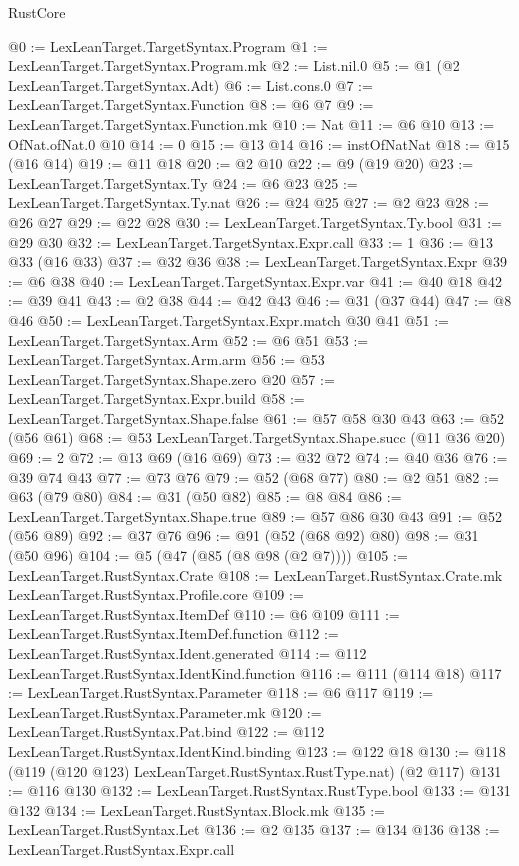 \begin{lexlean}{RustCore}
\begin{coremodule}
@0 := LexLeanTarget.TargetSyntax.Program
@1 := LexLeanTarget.TargetSyntax.Program.mk
@2 := List.nil.{0}
@5 := @1 (@2 LexLeanTarget.TargetSyntax.Adt)
@6 := List.cons.{0}
@7 := LexLeanTarget.TargetSyntax.Function
@8 := @6 @7
@9 := LexLeanTarget.TargetSyntax.Function.mk
@10 := Nat
@11 := @6 @10
@13 := OfNat.ofNat.{0} @10
@14 := 0
@15 := @13 @14
@16 := instOfNatNat
@18 := @15 (@16 @14)
@19 := @11 @18
@20 := @2 @10
@22 := @9 (@19 @20)
@23 := LexLeanTarget.TargetSyntax.Ty
@24 := @6 @23
@25 := LexLeanTarget.TargetSyntax.Ty.nat
@26 := @24 @25
@27 := @2 @23
@28 := @26 @27
@29 := @22 @28
@30 := LexLeanTarget.TargetSyntax.Ty.bool
@31 := @29 @30
@32 := LexLeanTarget.TargetSyntax.Expr.call
@33 := 1
@36 := @13 @33 (@16 @33)
@37 := @32 @36
@38 := LexLeanTarget.TargetSyntax.Expr
@39 := @6 @38
@40 := LexLeanTarget.TargetSyntax.Expr.var
@41 := @40 @18
@42 := @39 @41
@43 := @2 @38
@44 := @42 @43
@46 := @31 (@37 @44)
@47 := @8 @46
@50 := LexLeanTarget.TargetSyntax.Expr.match @30 @41
@51 := LexLeanTarget.TargetSyntax.Arm
@52 := @6 @51
@53 := LexLeanTarget.TargetSyntax.Arm.arm
@56 := @53 LexLeanTarget.TargetSyntax.Shape.zero @20
@57 := LexLeanTarget.TargetSyntax.Expr.build
@58 := LexLeanTarget.TargetSyntax.Shape.false
@61 := @57 @58 @30 @43
@63 := @52 (@56 @61)
@68 := @53 LexLeanTarget.TargetSyntax.Shape.succ (@11 @36 @20)
@69 := 2
@72 := @13 @69 (@16 @69)
@73 := @32 @72
@74 := @40 @36
@76 := @39 @74 @43
@77 := @73 @76
@79 := @52 (@68 @77)
@80 := @2 @51
@82 := @63 (@79 @80)
@84 := @31 (@50 @82)
@85 := @8 @84
@86 := LexLeanTarget.TargetSyntax.Shape.true
@89 := @57 @86 @30 @43
@91 := @52 (@56 @89)
@92 := @37 @76
@96 := @91 (@52 (@68 @92) @80)
@98 := @31 (@50 @96)
@104 := @5 (@47 (@85 (@8 @98 (@2 @7))))
@105 := LexLeanTarget.RustSyntax.Crate
@108 := LexLeanTarget.RustSyntax.Crate.mk LexLeanTarget.RustSyntax.Profile.core
@109 := LexLeanTarget.RustSyntax.ItemDef
@110 := @6 @109
@111 := LexLeanTarget.RustSyntax.ItemDef.function
@112 := LexLeanTarget.RustSyntax.Ident.generated
@114 := @112 LexLeanTarget.RustSyntax.IdentKind.function
@116 := @111 (@114 @18)
@117 := LexLeanTarget.RustSyntax.Parameter
@118 := @6 @117
@119 := LexLeanTarget.RustSyntax.Parameter.mk
@120 := LexLeanTarget.RustSyntax.Pat.bind
@122 := @112 LexLeanTarget.RustSyntax.IdentKind.binding
@123 := @122 @18
@130 := @118 (@119 (@120 @123) LexLeanTarget.RustSyntax.RustType.nat) (@2 @117)
@131 := @116 @130
@132 := LexLeanTarget.RustSyntax.RustType.bool
@133 := @131 @132
@134 := LexLeanTarget.RustSyntax.Block.mk
@135 := LexLeanTarget.RustSyntax.Let
@136 := @2 @135
@137 := @134 @136
@138 := LexLeanTarget.RustSyntax.Expr.call

\end{coremodule}
\end{lexlean}
